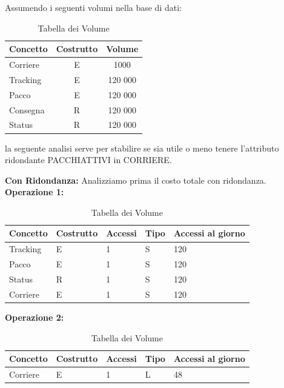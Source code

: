 Assumendo i seguenti volumi nella base di dati:

\begin{table}[H]
\centering
\begin{tabular}{lcc}
\toprule
\textbf{Concetto} & \textbf{Costrutto} & \textbf{Volume} \\ [0.5ex]
\midrule
    Corriere & E & 1000 \\
    Tracking & E & 120 000 \\
    Pacco & E & 120 000 \\
    Consegna & R & 120 000 \\
    Status & R & 120 000 \\
\bottomrule
    \end{tabular}
    \caption{Tabella dei Volume}
\end{table}


la seguente analisi serve per stabilire se sia utile o meno tenere l’attributo ridondante
PACCHIATTIVI in CORRIERE.

\textbf{Con Ridondanza:} Analizziamo prima il costo totale con ridondanza.\\
\textbf{Operazione 1:} 

\begin{table}[H]
\centering
\begin{tabular} {lllll}
    \toprule
    \textbf{Concetto} & \textbf{Costrutto} & \textbf{Accessi} & \textbf{Tipo} & \textbf{Accessi al giorno}\\ [0.5ex]
    \midrule
        Tracking & E & 1 & S & 120\\
        Pacco & E & 1 & S & 120\\
        Status & R & 1 & S & 120\\
        Corriere & E & 1 & S & 120\\
    \bottomrule
\end{tabular}
\caption{Tabella dei Volume}
\end{table}


\textbf{Operazione 2:}\\
\begin{table}[H]
\centering
\begin{tabular} {lllll}
    \toprule
    \textbf{Concetto} & \textbf{Costrutto} & \textbf{Accessi} & \textbf{Tipo} & \textbf{Accessi al giorno}\\ [0.5ex]
    \midrule
        Corriere & E & 1 & L & 48\\
    \bottomrule
\end{tabular}
\caption{Tabella dei Volume}
\end{table}

